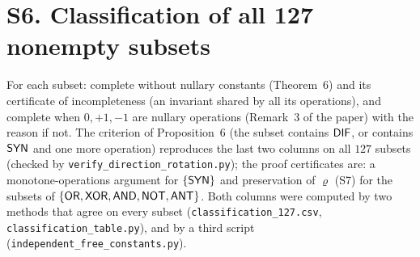 \documentclass[10pt,a4paper]{article}
\begin{document}
\section*{S6. Classification of all 127 nonempty subsets}
For each subset: complete without nullary constants (Theorem~6) and its certificate of incompleteness (an invariant shared by all its operations), and complete when $0,+1,-1$ are nullary operations (Remark~3 of the paper) with the reason if not. The criterion of Proposition~6 (the subset contains $\mathsf{DIF}$, or contains $\mathsf{SYN}$ and one more operation) reproduces the last two columns on all $127$ subsets (checked by \texttt{verify\_direction\_rotation.py}); the proof certificates are: a monotone-operations argument for $\{\mathsf{SYN}\}$ and preservation of $\varrho$ (S7) for the subsets of $\{\mathsf{OR},\mathsf{XOR},\mathsf{AND},\mathsf{NOT},\mathsf{ANT}\}$. Both columns were computed by two methods that agree on every subset (\texttt{classification\allowbreak\_127.csv}, \texttt{classification\allowbreak\_table.py}), and by a third script (\texttt{independent\allowbreak\_free\allowbreak\_constants.py}).
\end{document}

